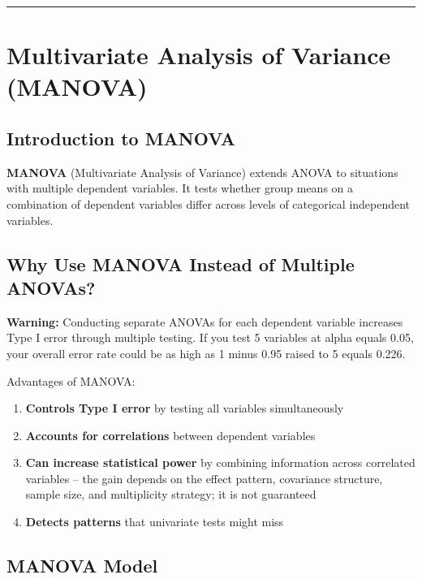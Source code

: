 \documentclass[
]{article}
\begin{document}
\begin{center}\rule{0.5\linewidth}{0.5pt}\end{center}

\textbf{ }

\section{Multivariate Analysis of Variance (MANOVA)}

\textbf{ }

\subsection{Introduction to MANOVA}

\textbf{MANOVA} (Multivariate Analysis of Variance) extends ANOVA to
situations with multiple dependent variables. It tests whether group
means on a combination of dependent variables differ across levels of
categorical independent variables.

\textbf{ }

\subsection{Why Use MANOVA Instead of Multiple ANOVAs?}

\textbf{Warning: } Conducting separate ANOVAs for each dependent
variable increases Type I error through multiple testing. If you test 5
variables at alpha equals 0.05, your overall error rate could be as high
as 1 minus 0.95 raised to 5 equals 0.226.

Advantages of MANOVA:

\begin{enumerate}
\item
  \textbf{Controls Type I error} by testing all variables simultaneously
\item
  \textbf{Accounts for correlations} between dependent variables
\item
  \textbf{Can increase statistical power} by combining information
  across correlated variables -- the gain depends on the effect pattern,
  covariance structure, sample size, and multiplicity strategy; it is
  not guaranteed
\item
  \textbf{Detects patterns} that univariate tests might miss
\end{enumerate}

\textbf{ }

\subsection{MANOVA Model}
\end{document}
